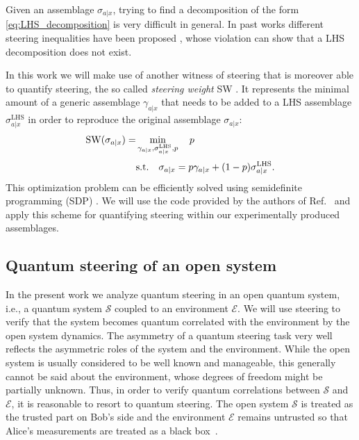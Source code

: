 \documentclass[aps,pra,twocolumn,superscriptaddress,showemail,showpacs,longbibliography]{revtex4-2}
\newcommand{\Sys}{\mathcal{S}} %
\newcommand{\Env}{\mathcal{E}} %
\begin{document}
Given an assemblage $\sigma_{a|x}$, trying to find a decomposition of the form \eqref{eq:LHS_decomposition} is very difficult in general. In past works different steering inequalities have been proposed \cite{CavalcantiExperimental-criteria-for-steering2009, WisemanAre-Dynamical-Quantum-Jumps2012, WollmannReference-frame-independent-Einstein-Podolsky-Rosen-steering2018}, whose violation can show that a LHS decomposition does not exist. 

In this work we will make use of another witness of steering that is moreover able to quantify steering, the so called \emph{steering weight} SW \cite{SkrzypczykQuantifying-Einstein-Podolsky-Rosen-Steering2014, cavalcantiQuantumSteeringReview2017}. It represents the minimal amount of a generic assemblage $\gamma_{a|x}$ that needs to be added to a LHS assemblage $\sigma^\text{LHS}_{a|x}$ in order to reproduce the original assemblage $\sigma_{a|x}$:
\begin{align}
    \label{eq:SW}
    \operatorname{SW}(\sigma_{a|x}) = &\min_{\vspace{10pt} \gamma_{a|x}, \sigma^\text{LHS}_{a|x}, p} \quad p \\[2pt]
    &\text{s.t.} \quad \sigma_{a|x} = p \gamma_{a|x} + (1-p) \sigma^\text{LHS}_{a|x}. \notag
\end{align}
This optimization problem can be efficiently solved using semidefinite programming (SDP) \cite{VandenbergheSemidefinite-Programming1996, cavalcantiQuantumSteeringReview2017}. We will use the code provided by the authors of Ref.~\cite{cavalcantiQuantumSteeringReview2017} and apply this scheme for quantifying steering within our experimentally produced assemblages.


\subsection{Quantum steering of an open system}
\label{sec:steerin-of-open-system}
In the present work we analyze quantum steering in an open quantum system, i.e., a quantum system $\Sys$ coupled to an environment $\Env$. We will use steering to verify that the system becomes quantum correlated with the environment by the open system dynamics. The asymmetry of a quantum steering task very well reflects the asymmetric roles of the system and the environment. While the open system is usually considered to be well known and manageable, this generally cannot be said about the environment, whose degrees of freedom might be partially unknown. Thus, in order to verify quantum correlations between $\Sys$ and $\Env$, it is reasonable to resort to quantum steering. The open system $\Sys$ is treated as the trusted part on Bob's side and the environment $\Env$ remains untrusted so that Alice's measurements are treated as a black box~\cite{WisemanAre-Dynamical-Quantum-Jumps2012,BeyerCollision-model-approach-to-steering2018,beyerSteeringHeatEngines2019}.
\end{document}

